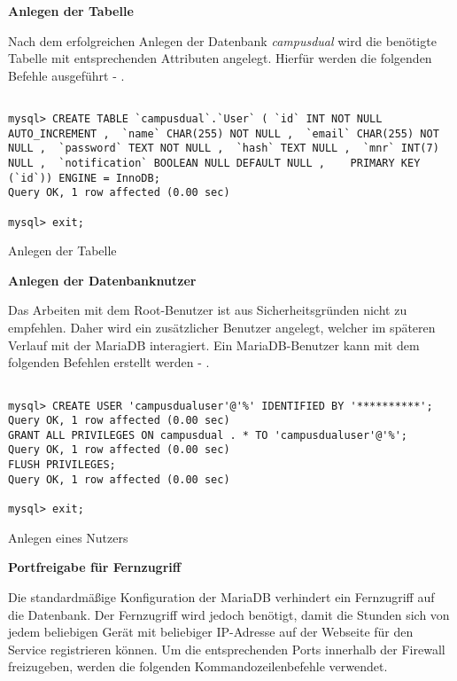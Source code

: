 \textbf{Anlegen der Tabelle}

Nach dem erfolgreichen Anlegen der Datenbank \textit{campusdual} wird die benötigte Tabelle mit entsprechenden Attributen angelegt.
Hierfür werden die folgenden Befehle ausgeführt - .

\begin{code}[H]
    \begin{verbatim}

mysql> CREATE TABLE `campusdual`.`User` ( `id` INT NOT NULL AUTO_INCREMENT ,  `name` CHAR(255) NOT NULL ,  `email` CHAR(255) NOT NULL ,  `password` TEXT NOT NULL ,  `hash` TEXT NULL ,  `mnr` INT(7) NULL ,  `notification` BOOLEAN NULL DEFAULT NULL ,    PRIMARY KEY  (`id`)) ENGINE = InnoDB;
Query OK, 1 row affected (0.00 sec)

mysql> exit;

    \end{verbatim}
    \caption[Anlegen der Tabelle]{Anlegen der Tabelle}
    \label{Anlegen der Tabelle}
\end{code}

\textbf{Anlegen der Datenbanknutzer}
\label{dbuser}

Das Arbeiten mit dem Root-Benutzer ist aus Sicherheitsgründen nicht zu empfehlen.
Daher wird ein zusätzlicher Benutzer angelegt, welcher im späteren Verlauf mit der MariaDB interagiert.
Ein MariaDB-Benutzer kann mit dem folgenden Befehlen erstellt werden - .

\begin{code}
    \begin{verbatim}

mysql> CREATE USER 'campusdualuser'@'%' IDENTIFIED BY '**********';
Query OK, 1 row affected (0.00 sec)
GRANT ALL PRIVILEGES ON campusdual . * TO 'campusdualuser'@'%';
Query OK, 1 row affected (0.00 sec)
FLUSH PRIVILEGES;
Query OK, 1 row affected (0.00 sec)

mysql> exit;

    \end{verbatim}
    \caption[Anlegen eines Nutzers]{Anlegen eines Nutzers}
    \label{Anlegen eines Nutzers}
\end{code}

\textbf{Portfreigabe für Fernzugriff}

Die standardmäßige Konfiguration der MariaDB verhindert ein Fernzugriff auf die Datenbank.
Der Fernzugriff wird jedoch benötigt, damit die Stunden sich von jedem beliebigen Gerät mit beliebiger IP-Adresse auf der Webseite für den Service registrieren können.
Um die entsprechenden Ports innerhalb der Firewall freizugeben, werden die folgenden Kommandozeilenbefehle verwendet.

